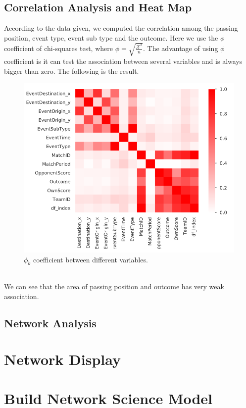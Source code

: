 \documentclass{mcmthesis}
\begin{document}
	\subsection{Correlation Analysis and Heat Map}
		According to the data given, we computed the correlation among the passing position, event type, event sub type and the outcome. Here we use the $\phi$ coefficient of chi-squares test, where $\phi=\sqrt{\frac{\mathcal{X}^2}{n}}$. The advantage of using $\phi$ coefficient is it can test the association between several variables and is always bigger than zero. The following is the result. 
		\begin{figure}[h!]
			\centering
			\includegraphics[scale=0.6]{images/cor_1.PNG}
			\caption{$\phi_k$ coefficient between different variables. }
		\end{figure} \\
		We can see that the area of passing position and outcome has very weak association. 
		
		
	\subsection{Network Analysis}
	
\section{Network Display}


\section{Build Network Science Model}
\end{document}
